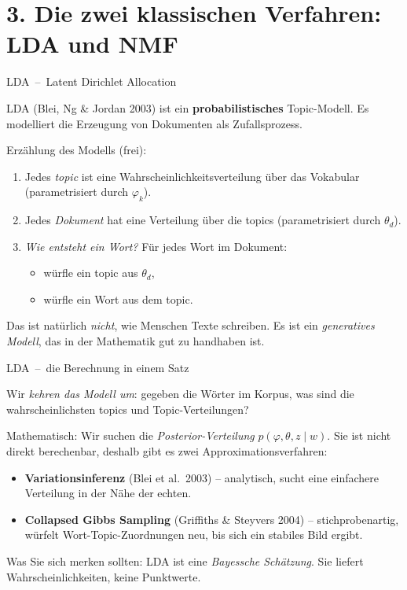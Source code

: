 \documentclass[aspectratio=169,11pt]{beamer}
\newcommand{\mdash}{\,{\monodash–}\,}
\let\oldemph\emph
\renewcommand{\emph}[1]{{\color{solCyan}\oldemph{#1}}}
\let\oldtextbf\textbf
\renewcommand{\textbf}[1]{{\color{solBase3}\oldtextbf{#1}}}
\begin{document}
\section{3. Die zwei klassischen Verfahren: LDA und NMF}

\begin{frame}{LDA \mdash{} Latent Dirichlet Allocation}

  LDA (Blei, Ng \& Jordan 2003) ist ein \textbf{probabilistisches}
  Topic-Modell. Es modelliert die Erzeugung von Dokumenten als
  Zufallsprozess.

  \vfill
  Erzählung des Modells (frei):
  \begin{enumerate}
    \item Jedes \emph{topic} ist eine Wahrscheinlichkeitsverteilung
          über das Vokabular (parametrisiert durch $\varphi_k$).
    \vfill
    \item Jedes \emph{Dokument} hat eine Verteilung über die topics
          (parametrisiert durch $\theta_d$).
    \vfill
    \item \emph{Wie entsteht ein Wort?} Für jedes Wort im Dokument:
          \begin{itemize}
            \item würfle ein topic aus $\theta_d$,
            \item würfle ein Wort aus dem topic.
          \end{itemize}
  \end{enumerate}

  \vfill
  Das ist natürlich \emph{nicht}, wie Menschen Texte schreiben. Es ist
  ein \emph{generatives Modell}, das in der Mathematik gut zu
  handhaben ist.

\end{frame}

\begin{frame}{LDA \mdash{} die Berechnung in einem Satz}

  Wir \emph{kehren das Modell um}: gegeben die Wörter im Korpus, was
  sind die wahrscheinlichsten topics und Topic-Verteilungen?

  \vfill
  Mathematisch: Wir suchen die \emph{Posterior-Verteilung}
  $p(\varphi, \theta, z \mid w)$.
  Sie ist nicht direkt berechenbar, deshalb gibt es zwei
  Approximationsverfahren:
  \vfill
  \begin{itemize}
    \item \textbf{Variationsinferenz} (Blei et al.\ 2003) –
          analytisch, sucht eine einfachere Verteilung in der Nähe
          der echten.
    \vfill
    \item \textbf{Collapsed Gibbs Sampling} (Griffiths \& Steyvers
          2004) – stichprobenartig, würfelt Wort-Topic-Zuordnungen
          neu, bis sich ein stabiles Bild ergibt.
  \end{itemize}

  \vfill
  \footnotesize\color{black!60}
  Was Sie sich merken sollten: LDA ist eine \emph{Bayessche
  Schätzung}. Sie liefert Wahrscheinlichkeiten, keine Punktwerte.

\end{frame}
\end{document}
